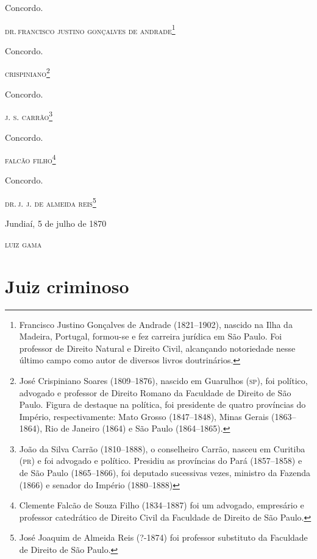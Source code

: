 Concordo.

\quad\textsc{dr.\,francisco justino gonçalves de andrade}\footnote{ Francisco
  Justino Gonçalves de Andrade (1821--1902), nascido na Ilha da Madeira,
  Portugal, formou-se e fez carreira jurídica em São Paulo. Foi
  professor de Direito Natural e Direito Civil, alcançando notoriedade
  nesse último campo como autor de diversos livros doutrinários.}

Concordo.

\quad\textsc{crispiniano}\footnote{ José Crispiniano Soares (1809--1876),
  nascido em Guarulhos (\textsc{sp}), foi político, advogado e professor de
  Direito Romano da Faculdade de Direito de São Paulo. Figura de
  destaque na política, foi presidente de quatro províncias do Império,
  respectivamente: Mato Grosso (1847--1848), Minas Gerais (1863--1864),
  Rio de Janeiro (1864) e São Paulo (1864--1865).}

Concordo.

\quad\textsc{j. s. carrão}\footnote{ João da Silva Carrão (1810--1888), o
  conselheiro Carrão, nasceu em Curitiba (\textsc{pr}) e foi advogado e político.
  Presidiu as províncias do Pará (1857--1858) e de São Paulo (1865--1866),
  foi deputado sucessivas vezes, ministro da Fazenda (1866) e senador do
  Império (1880--1888)}

Concordo.

\quad\textsc{falcão filho}\footnote{ Clemente Falcão de Souza Filho
  (1834--1887) foi um advogado, empresário e professor catedrático de
  Direito Civil da Faculdade de Direito de São Paulo.}

Concordo.

\quad\textsc{dr.\,j. j. de almeida reis}\footnote{ José Joaquim de Almeida Reis
  (?-1874) foi professor substituto da Faculdade de Direito de São
  Paulo.}

\begin{flushright}
Jundiaí, 5 de julho de 1870

\textsc{luiz gama}
\end{flushright}

\part{Juiz criminoso}

